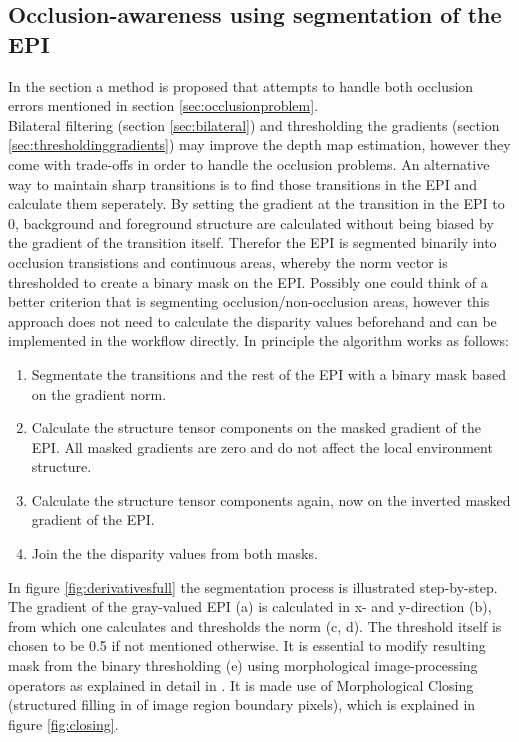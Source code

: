 \documentclass  [
  paper    = a4,
  BCOR     = 10mm,
  twoside,
  fontsize = 12pt,
  fleqn,
  toc      = bibnumbered,
  toc      = listofnumbered,
  numbers  = noendperiod,
  headings = normal,
  listof   = leveldown,
  version  = 3.03
]                                       {scrreprt}
\begin{document}
 \subsection{Occlusion-awareness using segmentation of the EPI}
 \label{sec:occlusionsegmentation}
 In the section a method is proposed that attempts to handle both occlusion errors mentioned in section \ref{sec:occlusionproblem}.\\
 Bilateral filtering (section \ref{sec:bilateral}) and thresholding the gradients (section \ref{sec:thresholdinggradients}) may improve the depth map estimation, however they come with trade-offs in order to handle the occlusion problems. An alternative way to maintain sharp transitions is to find those transitions in the EPI and calculate them seperately. By setting the gradient at the transition in the EPI to 0, background and foreground structure are calculated without being biased by the gradient of the transition itself. Therefor the EPI is segmented binarily into occlusion transistions and continuous areas, whereby the norm vector is thresholded to create a binary mask on the EPI. Possibly one could think of a better criterion that is segmenting occlusion/non-occlusion areas, however this approach does not need to calculate the disparity values beforehand and can be implemented in the workflow directly. In principle the algorithm works as follows:
 \begin{enumerate}
 	\item Segmentate the transitions and the rest of the EPI with a binary mask based on the gradient norm.
 	\item Calculate the structure tensor components on the masked gradient of the EPI. All masked gradients are zero and do not affect the local environment structure.
 	\item Calculate the structure tensor components again, now on the inverted masked gradient of the EPI.
 	\item Join the the disparity values from both masks.
 \end{enumerate}
 In figure \ref{fig:derivativesfull} the segmentation process is illustrated step-by-step. The gradient of the gray-valued EPI (a) is calculated in x- and y-direction (b), from which one calculates and thresholds the norm (c, d). The threshold itself is chosen to be 0.5 if not mentioned otherwise. It is essential to modify resulting mask from the binary thresholding (e)  using morphological image-processing operators as explained in detail in \cite{homepages.inf.ed.ac.uk}. It is made use of Morphological Closing (structured filling in of image region boundary pixels), which is explained in figure \ref{fig:closing}.\\
\end{document}
